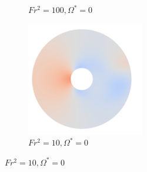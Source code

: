 \begin{figure}
\begin{subfigure}[b]{0.25\textwidth}
        \caption{$Fr^2 = 100, \Omega^{\ast} = 0$}
        \label{fig:ps0fs100}
    \end{subfigure}
    \hfill
    \begin{subfigure}[b]{0.25\textwidth}
        \centering
        \includegraphics[width=\textwidth]{images/circle/ps0fs10.png}
        \caption{$Fr^2 = 10, \Omega^{\ast} = 0$}
        \label{fig:ps0fs10}
    \end{subfigure}
    

\end{figure}
